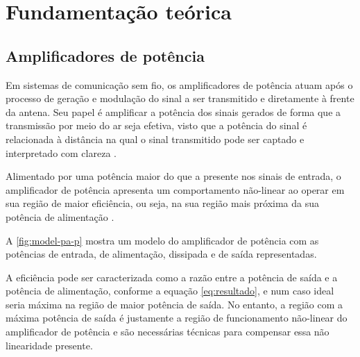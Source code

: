 \chapter{Fundamentação teórica} \label{cha:fundteo}

\section{Amplificadores de potência} \label{sec:fundteo-pa}

Em sistemas de comunicação sem fio, os amplificadores de potência atuam após o processo de geração e modulação do sinal a ser transmitido e diretamente à frente da antena. Seu papel é amplificar a potência dos sinais gerados de forma que a transmissão por meio do ar seja efetiva, visto que a potência do sinal é relacionada à distância na qual o sinal transmitido pode ser captado e interpretado com clareza \cite{raychaudhuri_frontiers_2012}.

Alimentado por uma potência maior do que a presente nos sinais de entrada, o amplificador de potência apresenta um comportamento não-linear ao operar em sua região de maior eficiência, ou seja, na sua região mais próxima da sua potência de alimentação \cite{cripps_rf_2006}.

A \autoref{fig:model-pa-p} mostra um modelo do amplificador de potência com as potências de entrada, de alimentação, dissipada e de saída representadas.


A eficiência \label{item:efi} pode ser caracterizada como a razão entre a potência de saída e a potência de alimentação, conforme a equação \ref{eq:resultado}, e num caso ideal seria máxima na região de maior potência de saída. No entanto, a região com a máxima potência de saída é justamente a região de funcionamento não-linear do amplificador de potência e são necessárias técnicas para compensar essa não linearidade presente.

